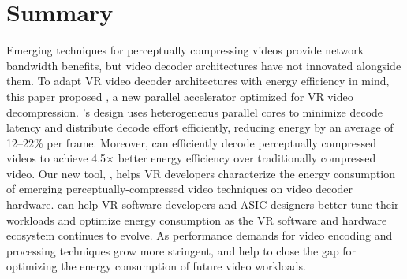 \clearpage
\section{Summary}
Emerging techniques for perceptually compressing videos provide network bandwidth benefits, but video decoder architectures have not innovated alongside them.
To adapt VR video decoder architectures with energy efficiency in mind, this paper proposed \nameArch, a new parallel accelerator optimized for VR video decompression.
\nameArch's design uses heterogeneous parallel cores to minimize decode latency and distribute decode effort efficiently, reducing energy by an average of 12--22\% per frame.
Moreover, \nameArch can efficiently decode perceptually compressed videos to achieve 4.5$\times$ better energy efficiency over traditionally compressed video.
Our new tool, \nameArchprof, helps VR developers characterize the energy consumption of emerging perceptually-compressed video techniques on video decoder hardware.
\nameArchprof can help VR software developers and ASIC designers better tune their workloads and optimize energy consumption as the VR software and hardware ecosystem continues to evolve.
As performance demands for video encoding and processing techniques grow more stringent, \nameArch and \nameArchprof help to close the gap for optimizing the energy consumption of future video workloads.
